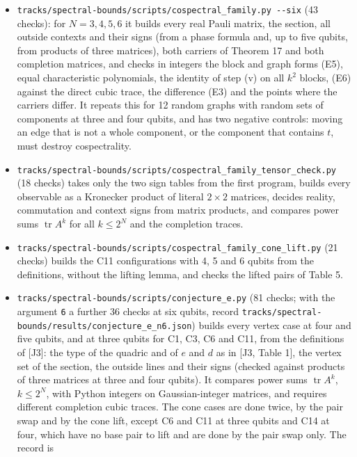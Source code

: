 \documentclass[11pt,a4paper]{article}
\providecommand{\tightlist}{\setlength{\itemsep}{0pt}\setlength{\parskip}{0pt}}
\begin{document}
\begin{itemize}
\tightlist
\item
  \texttt{tracks/spectral-bounds/scripts/cospectral\_family.py\ -\/-six} (43 checks): for \(N=3,4,5,6\) it builds every real Pauli matrix,
  the section, all outside contexts and their signs (from a phase formula and, up to five qubits, from
  products of three matrices), both carriers of Theorem 17 and both completion matrices, and checks in
  integers the block and graph forms (E5), equal characteristic polynomials, the identity of step (v)
  on all \(k^2\) blocks, (E6) against the direct cubic trace, the difference (E3) and the points where the
  carriers differ. It repeats this for 12 random graphs with random sets of components at three and
  four qubits, and has two negative controls: moving an edge that is not a whole component, or the
  component that contains \(t\), must destroy cospectrality.
\item
  \nolinkurl{tracks/spectral-bounds/scripts/cospectral_family_tensor_check.py} (18 checks) takes only the two sign tables from the first
  program, builds every observable as a Kronecker product of literal \(2\times2\) matrices, decides
  reality, commutation and context signs from matrix products, and compares power sums
  \(\operatorname{tr}A^k\) for all \(k\le2^N\) and the completion traces.
\item
  \nolinkurl{tracks/spectral-bounds/scripts/cospectral_family_cone_lift.py} (21 checks) builds the C11 configurations with 4, 5 and 6
  qubits from the definitions, without the lifting lemma, and checks the lifted pairs of Table 5.
\item
  \nolinkurl{tracks/spectral-bounds/scripts/conjecture_e.py} (81 checks; with the argument \texttt{6} a further 36 checks at six qubits, record
  \nolinkurl{tracks/spectral-bounds/results/conjecture_e_n6.json}) builds every vertex case at four and five qubits, and at three
  qubits for C1, C3, C6 and C11, from the definitions of {[}J3{]}: the type of the quadric and of \(e\) and \(d\)
  as in {[}J3, Table 1{]}, the vertex set of the section, the outside lines and their signs (checked against
  products of three matrices at three and four qubits). It compares power sums \(\operatorname{tr}A^k\), \(k\le2^N\), with
  Python integers on Gaussian-integer matrices, and requires different completion cubic traces. The cone
  cases are done twice, by the pair swap and by the cone lift, except C6 and C11 at three qubits and C14
  at four, which have no base pair to lift and are done by the pair swap only. The record is

\end{itemize}
\end{document}
